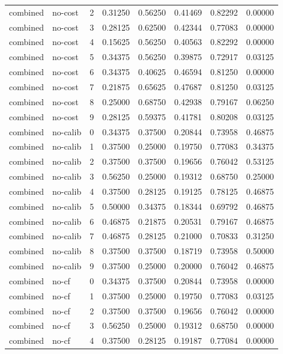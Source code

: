 \documentclass{article}
\begin{document}
\begin{center}
\begin{longtable}{llllllll}
combined & no-cost & 2 & 0.31250 & 0.56250 & 0.41469 & 0.82292 & 0.00000 \\
combined & no-cost & 3 & 0.28125 & 0.62500 & 0.42344 & 0.77083 & 0.00000 \\
combined & no-cost & 4 & 0.15625 & 0.56250 & 0.40563 & 0.82292 & 0.00000 \\
combined & no-cost & 5 & 0.34375 & 0.56250 & 0.39875 & 0.72917 & 0.03125 \\
combined & no-cost & 6 & 0.34375 & 0.40625 & 0.46594 & 0.81250 & 0.00000 \\
combined & no-cost & 7 & 0.21875 & 0.65625 & 0.47687 & 0.81250 & 0.03125 \\
combined & no-cost & 8 & 0.25000 & 0.68750 & 0.42938 & 0.79167 & 0.06250 \\
combined & no-cost & 9 & 0.28125 & 0.59375 & 0.41781 & 0.80208 & 0.03125 \\
combined & no-calib & 0 & 0.34375 & 0.37500 & 0.20844 & 0.73958 & 0.46875 \\
combined & no-calib & 1 & 0.37500 & 0.25000 & 0.19750 & 0.77083 & 0.34375 \\
combined & no-calib & 2 & 0.37500 & 0.37500 & 0.19656 & 0.76042 & 0.53125 \\
combined & no-calib & 3 & 0.56250 & 0.25000 & 0.19312 & 0.68750 & 0.25000 \\
combined & no-calib & 4 & 0.37500 & 0.28125 & 0.19125 & 0.78125 & 0.46875 \\
combined & no-calib & 5 & 0.50000 & 0.34375 & 0.18344 & 0.69792 & 0.46875 \\
combined & no-calib & 6 & 0.46875 & 0.21875 & 0.20531 & 0.79167 & 0.46875 \\
combined & no-calib & 7 & 0.46875 & 0.28125 & 0.21000 & 0.70833 & 0.31250 \\
combined & no-calib & 8 & 0.37500 & 0.37500 & 0.18719 & 0.73958 & 0.50000 \\
combined & no-calib & 9 & 0.37500 & 0.25000 & 0.20000 & 0.76042 & 0.46875 \\
combined & no-cf & 0 & 0.34375 & 0.37500 & 0.20844 & 0.73958 & 0.00000 \\
combined & no-cf & 1 & 0.37500 & 0.25000 & 0.19750 & 0.77083 & 0.03125 \\
combined & no-cf & 2 & 0.37500 & 0.37500 & 0.19656 & 0.76042 & 0.00000 \\
combined & no-cf & 3 & 0.56250 & 0.25000 & 0.19312 & 0.68750 & 0.00000 \\
combined & no-cf & 4 & 0.37500 & 0.28125 & 0.19187 & 0.77084 & 0.00000 \\

\end{longtable}
\end{center}
\end{document}
